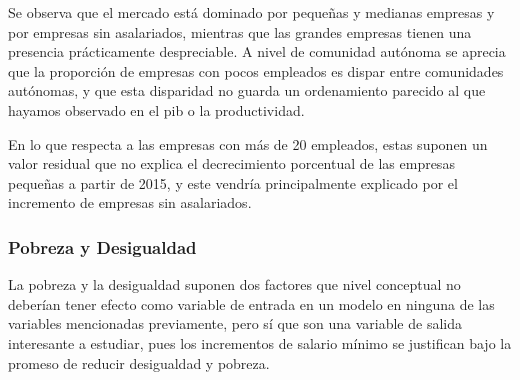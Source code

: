 \documentclass[11pt]{article}
\begin{document}
    Se observa que el mercado está dominado por pequeñas y medianas empresas
y por empresas sin asalariados, mientras que las grandes empresas tienen
una presencia prácticamente despreciable. A nivel de comunidad autónoma
se aprecia que la proporción de empresas con pocos empleados es dispar
entre comunidades autónomas, y que esta disparidad no guarda un
ordenamiento parecido al que hayamos observado en el pib o la
productividad.

En lo que respecta a las empresas con más de 20 empleados, estas suponen
un valor residual que no explica el decrecimiento porcentual de las
empresas pequeñas a partir de 2015, y este vendría principalmente
explicado por el incremento de empresas sin asalariados.

    \subsubsection{Pobreza y Desigualdad}\label{pobreza-y-desigualdad}

    La pobreza y la desigualdad suponen dos factores que nivel conceptual no
deberían tener efecto como variable de entrada en un modelo en ninguna
de las variables mencionadas previamente, pero sí que son una variable
de salida interesante a estudiar, pues los incrementos de salario mínimo
se justifican bajo la promeso de reducir desigualdad y pobreza.
\end{document}
